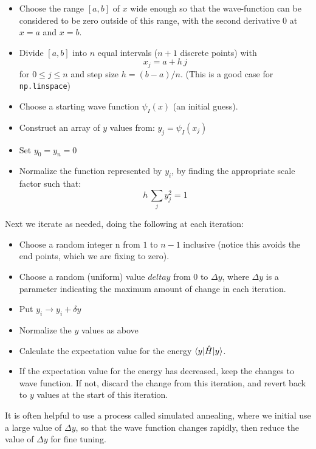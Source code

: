 \documentclass[12pt]{article}
\begin{document}
\begin{itemize}
\item Choose the range $[a,b]$ of $x$ wide enough so that the wave-function can 
be considered to be zero outside of this range, with the second derivative 0 at $x=a$ and $x=b$.
\item Divide $[a,b]$ into $n$ equal intervals ($n+1$ discrete points) with
$$x_j = a + h\,j$$ for $0 \leq j \leq n$ and step size $h = (b-a)/n$.  (This is a good case for {\tt np.linspace})
\item Choose a starting wave function $\psi_I(x)$ (an initial guess).
\item Construct an array of $y$ values from:
  $y_j = \psi_I(x_j)$
\item Set $y_0 = y_{n} = 0$
\item Normalize the function represented by $y_i$, by finding the appropriate scale factor such that:
$$h \, \sum_j y_j^2 = 1$$
\end{itemize}
Next we iterate as needed, doing the following at each iteration:
\begin{itemize}
\item Choose a random integer n from $1$ to $n-1$ inclusive (notice this avoids the end points, which we are fixing to zero).
\item Choose a random (uniform) value $delta y$ from 0 to $\Delta y$, where $\Delta y$ is a parameter indicating the maximum amount of change in each iteration.
\item Put $y_i \to y_i + \delta y$
\item Normalize the $y$ values as above
\item Calculate the expectation value for the energy $\braket{y|\hat{H}|y}$.
\item If the expectation value for the energy has decreased, keep the changes to wave function.  If not, discard the change from this iteration, and revert back to $y$ values at the start of this iteration.
\end{itemize}  
It is often helpful to use a process called simulated annealing, where we initial use a large value of $\Delta y$, so that the wave function changes rapidly, then reduce the value of $\Delta y$ for fine tuning.


\end{document}
